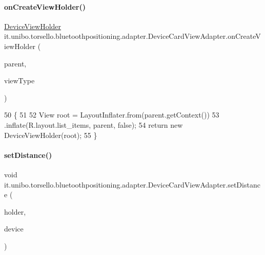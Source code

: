 \paragraph{\texorpdfstring{on\+Create\+View\+Holder()}{onCreateViewHolder()}}
{\footnotesize\ttfamily \hyperlink{classit_1_1unibo_1_1torsello_1_1bluetoothpositioning_1_1adapter_1_1DeviceCardViewAdapter_1_1DeviceViewHolder}{Device\+View\+Holder} it.\+unibo.\+torsello.\+bluetoothpositioning.\+adapter.\+Device\+Card\+View\+Adapter.\+on\+Create\+View\+Holder (\begin{DoxyParamCaption}\item[{View\+Group}]{parent,  }\item[{int}]{view\+Type }\end{DoxyParamCaption})}


\begin{DoxyCode}
50                                                                                \{
51 
52         View root = LayoutInflater.from(parent.getContext())
53                 .inflate(R.layout.list\_items, parent, \textcolor{keyword}{false});
54         \textcolor{keywordflow}{return} \textcolor{keyword}{new} DeviceViewHolder(root);
55     \}
\end{DoxyCode}
\hypertarget{classit_1_1unibo_1_1torsello_1_1bluetoothpositioning_1_1adapter_1_1DeviceCardViewAdapter_a8d5baa2d386a92ba4fb20b71e6e517f9_a8d5baa2d386a92ba4fb20b71e6e517f9}{}\label{classit_1_1unibo_1_1torsello_1_1bluetoothpositioning_1_1adapter_1_1DeviceCardViewAdapter_a8d5baa2d386a92ba4fb20b71e6e517f9_a8d5baa2d386a92ba4fb20b71e6e517f9} 
\paragraph{\texorpdfstring{set\+Distance()}{setDistance()}}
{\footnotesize\ttfamily void it.\+unibo.\+torsello.\+bluetoothpositioning.\+adapter.\+Device\+Card\+View\+Adapter.\+set\+Distance (\begin{DoxyParamCaption}\item[{\hyperlink{classit_1_1unibo_1_1torsello_1_1bluetoothpositioning_1_1adapter_1_1DeviceCardViewAdapter_1_1DeviceViewHolder}{Device\+View\+Holder}}]{holder,  }\item[{\hyperlink{classit_1_1unibo_1_1torsello_1_1bluetoothpositioning_1_1model_1_1Device}{Device}}]{device }\end{DoxyParamCaption})\hspace{0.3cm}{\ttfamily [private]}}


